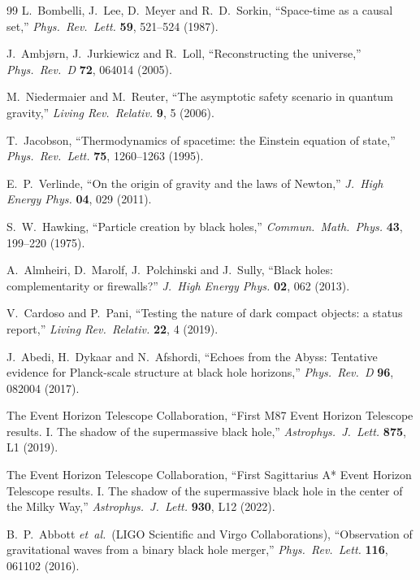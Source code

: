 \documentclass[dvipdfmx,11pt,a4paper]{article}
\begin{document}
\begin{thebibliography}{99}
L.~Bombelli, J.~Lee, D.~Meyer and R.~D.~Sorkin,
``Space-time as a causal set,''
\textit{Phys.\ Rev.\ Lett.} \textbf{59}, 521--524 (1987).

J.~Ambj{\o}rn, J.~Jurkiewicz and R.~Loll,
``Reconstructing the universe,''
\textit{Phys.\ Rev.\ D} \textbf{72}, 064014 (2005).

M.~Niedermaier and M.~Reuter,
``The asymptotic safety scenario in quantum gravity,''
\textit{Living Rev.\ Relativ.} \textbf{9}, 5 (2006).

T.~Jacobson,
``Thermodynamics of spacetime: the Einstein equation of state,''
\textit{Phys.\ Rev.\ Lett.} \textbf{75}, 1260--1263 (1995).

E.~P.~Verlinde,
``On the origin of gravity and the laws of Newton,''
\textit{J.\ High Energy Phys.} \textbf{04}, 029 (2011).

S.~W.~Hawking,
``Particle creation by black holes,''
\textit{Commun.\ Math.\ Phys.} \textbf{43}, 199--220 (1975).

A.~Almheiri, D.~Marolf, J.~Polchinski and J.~Sully,
``Black holes: complementarity or firewalls?''
\textit{J.\ High Energy Phys.} \textbf{02}, 062 (2013).

V.~Cardoso and P.~Pani,
``Testing the nature of dark compact objects: a status report,''
\textit{Living Rev.\ Relativ.} \textbf{22}, 4 (2019).

J.~Abedi, H.~Dykaar and N.~Afshordi,
``Echoes from the Abyss: Tentative evidence for Planck-scale structure at black hole horizons,''
\textit{Phys.\ Rev.\ D} \textbf{96}, 082004 (2017).

The Event Horizon Telescope Collaboration,
``First M87 Event Horizon Telescope results. I. The shadow of the supermassive black hole,''
\textit{Astrophys.\ J.\ Lett.} \textbf{875}, L1 (2019).

The Event Horizon Telescope Collaboration,
``First Sagittarius A* Event Horizon Telescope results. I. The shadow of the supermassive black hole in the center of the Milky Way,''
\textit{Astrophys.\ J.\ Lett.} \textbf{930}, L12 (2022).

B.~P.~Abbott \textit{et~al.}\ (LIGO Scientific and Virgo Collaborations),
``Observation of gravitational waves from a binary black hole merger,''
\textit{Phys.\ Rev.\ Lett.} \textbf{116}, 061102 (2016).


\end{thebibliography}
\end{document}
